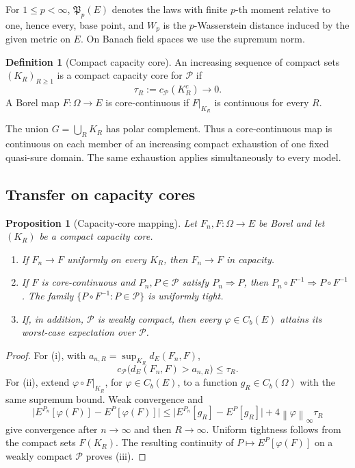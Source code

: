 \documentclass[11pt,reqno]{amsart}
\theoremstyle{plain}
\newtheorem{proposition}[proposition]{Proposition}
\theoremstyle{definition}
\newtheorem{definition}[definition]{Definition}
\newcommand{\cP}{\mathcal P}
\newcommand{\norm}[1]{\left\lVert #1\right\rVert}
\begin{document}
For \(1\le p<\infty\), \(\mathfrak P_p(E)\) denotes the laws with finite
\(p\)-th moment relative to one, hence every, base point, and \(W_p\) is the
\(p\)-Wasserstein distance induced by the given metric on \(E\).  On Banach
field spaces we use the supremum norm.

\begin{definition}[Compact capacity core]\label{def:capacity-core}
An increasing sequence of compact sets \((K_R)_{R\ge1}\) is a compact
capacity core for \(\cP\) if
\[
  \tau_R:=c_{\cP}(K_R^c)\longrightarrow0.
\]
A Borel map \(F:\Omega\to E\) is core-continuous if \(F|_{K_R}\) is
continuous for every \(R\).
\end{definition}

The union \(G=\bigcup_RK_R\) has polar complement.  Thus a core-continuous
map is continuous on each member of an increasing compact exhaustion of one
fixed quasi-sure domain.  The same exhaustion applies simultaneously to
every model.

\subsection{Transfer on capacity cores}

\begin{proposition}[Capacity-core mapping]\label{thm:core-transfer}
Let \(F_n,F:\Omega\to E\) be Borel and let \((K_R)\) be a compact capacity
core.
\begin{enumerate}[leftmargin=2.2em,label=(\roman*)]
  \item If \(F_n\to F\) uniformly on every \(K_R\), then \(F_n\to F\) in
  capacity.
  \item If \(F\) is core-continuous and \(P_n,P\in\cP\) satisfy
  \(P_n\Rightarrow P\), then
  \(P_n\circ F^{-1}\Rightarrow P\circ F^{-1}\).  The family
  \(\{P\circ F^{-1}:P\in\cP\}\) is uniformly tight.
  \item If, in addition, \(\cP\) is weakly compact, then every
  \(\varphi\in C_b(E)\) attains its worst-case expectation over \(\cP\).
\end{enumerate}
\end{proposition}

\begin{proof}
For (i), with \(a_{n,R}=\sup_{K_R}d_E(F_n,F)\),
\[
  c_{\cP}\bigl(d_E(F_n,F)>a_{n,R}\bigr)\le\tau_R.
\]
For (ii), extend \(\varphi\circ F|_{K_R}\), for
\(\varphi\in C_b(E)\), to a function \(g_R\in C_b(\Omega)\) with the same
supremum bound.  Weak convergence and
\[
  \bigl|E^{P_n}[\varphi(F)]-E^P[\varphi(F)]\bigr|
  \le \bigl|E^{P_n}[g_R]-E^P[g_R]\bigr|
      +4\norm{\varphi}_\infty\tau_R
\]
give convergence after \(n\to\infty\) and then \(R\to\infty\).
Uniform tightness follows from the compact sets \(F(K_R)\).  The resulting
continuity of \(P\mapsto E^P[\varphi(F)]\) on a weakly compact \(\cP\)
proves (iii).
\end{proof}
\end{document}
